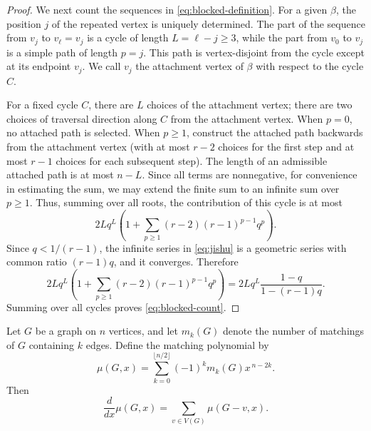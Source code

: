 \documentclass[11pt, a4paper]{article}
\begin{document}
\begin{proof}
We next count the sequences in \eqref{eq:blocked-definition}.
For a given $\beta$, the position $j$ of the repeated vertex is uniquely determined.
The part of the sequence from $v_j$ to $v_\ell=v_j$ is a cycle of length $L=\ell-j\geq3$,
while the part from $v_0$ to $v_j$ is a simple path of length $p=j$.
This path is vertex-disjoint from the cycle except at its endpoint $v_j$.
We call $v_j$ the attachment vertex of $\beta$ with respect to the cycle $C$.

For a fixed cycle $C$, there are $L$ choices of the attachment vertex;
there are two choices of traversal direction along $C$ from the attachment vertex.
When $p=0$, no attached path is selected.
When $p\geq1$, construct the attached path backwards from the attachment vertex (with at most $r-2$ choices for the first step
and at most $r-1$ choices for each subsequent step).
The length of an admissible attached path is at most $n-L$. Since all terms are nonnegative, for convenience in estimating the sum,
we may extend the finite sum to an infinite sum over $p\ge1$.
Thus, summing over all roots, the contribution of this cycle is at most
\begin{equation}\label{eq:jishu}
 2Lq^L\left(1+\sum_{p\geq1}(r-2)(r-1)^{p-1}q^p\right).
\end{equation}
Since $q<1/(r-1)$, the infinite series in \eqref{eq:jishu} is
a geometric series with common ratio $(r-1)q$, and it converges. Therefore
\[
 2Lq^L\left(1+\sum_{p\geq1}(r-2)(r-1)^{p-1}q^p\right)
 =2Lq^L\frac{1-q}{1-(r-1)q}.
\]
Summing over all cycles proves \eqref{eq:blocked-count}.
\end{proof}

\begin{lemma}[\cite{va3}]\label{lemma:30}
Let $G$ be a graph on $n$ vertices,
and let $m_k(G)$ denote the number of matchings of $G$ containing $k$ edges.
Define the matching polynomial by
\[
\mu(G,x)
=
\sum_{k=0}^{\lfloor n/2\rfloor}
(-1)^k m_k(G)x^{\, n-2k}.
\]
Then
\[
\frac{d}{dx}\mu(G,x)
=
\sum_{v\in V(G)}\mu(G-v,x).
\]
\end{lemma}
\end{document}
